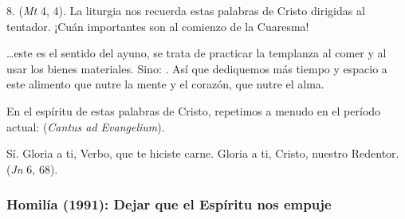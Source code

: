 \begin{body}
8.  (\textit{Mt} 4, 4). La liturgia nos recuerda estas palabras de Cristo dirigidas al tentador. ¡Cuán importantes son al comienzo de la Cuaresma!

\ldots este es el sentido del ayuno, se trata de practicar la templanza al comer y al usar los bienes materiales. Sino: . Así que dediquemos más tiempo y espacio a este alimento que nutre la mente y el corazón, que nutre el alma.

En el espíritu de estas palabras de Cristo, repetimos a menudo en el período actual:  (\textit{Cantus ad Evangelium}).

Sí. Gloria a ti, Verbo, que te hiciste carne. Gloria a ti, Cristo, nuestro Redentor.  (\textit{Jn} 6, 68).
\end{body}


\label{b-03-01-1988H}
\newpage

\subsubsection{Homilía (1991): Dejar que el Espíritu nos empuje}


